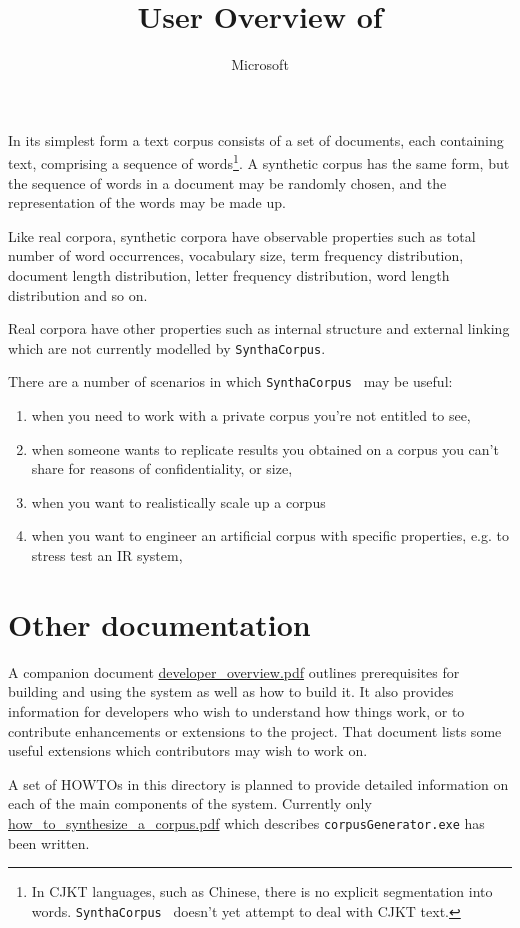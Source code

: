 \documentclass{article}
\title{User Overview of \projectName}
\author{Microsoft}
\newcommand{\projectName}{\texttt{SynthaCorpus}}
\begin{document}
\maketitle{}



In its simplest form a text corpus consists of a set of documents,
each containing text,  comprising a sequence of words\footnote{In CJKT languages, such
  as Chinese, there is no explicit segmentation into
  words. \projectName~ doesn't yet attempt to deal with CJKT text.}.
A synthetic corpus has the same form, but the sequence of words in a
document may be randomly chosen, and the representation of the words
may be made up.

Like real corpora, synthetic corpora have observable properties such
as total number of word occurrences, vocabulary size, term frequency
distribution, document length distribution, letter frequency
distribution, word length distribution and so on.

Real corpora have other properties such as internal structure and
external linking which are not currently modelled by \projectName.

There are a number of scenarios in which \projectName~ may be useful:
\begin{enumerate}
  \item when you need to work with a private corpus you're
    not entitled to see,
  \item when someone wants to replicate results
    you obtained on a corpus you can't share  for reasons of
    confidentiality, or size,
  \item when you want to realistically scale up a corpus
  \item when you want to engineer an artificial corpus with 
    specific properties, e.g. to stress test an IR system,
\end{enumerate}


\section{Other documentation}
A companion document \url{developer_overview.pdf} outlines
prerequisites for building and using the system as well as how to
build it.  It also provides
information for developers who wish to understand how things work, or
to contribute enhancements or extensions to the project.  That
document lists some useful extensions which contributors may wish to
work on.

A set of HOWTOs in this directory is planned to  provide detailed
information on each of the main components of the system.  Currently
only \url{how_to_synthesize_a_corpus.pdf} which describes
\verb|corpusGenerator.exe| has been written.
\end{document}
